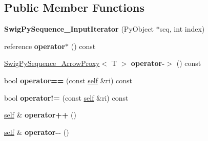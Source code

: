 \subsection*{Public Member Functions}
\begin{DoxyCompactItemize}
\item 
\hypertarget{structswig_1_1_swig_py_sequence___input_iterator_a4c4588a112b05a77b096d5fc87d04d67}{{\bfseries Swig\-Py\-Sequence\-\_\-\-Input\-Iterator} (Py\-Object $\ast$seq, int index)}\label{structswig_1_1_swig_py_sequence___input_iterator_a4c4588a112b05a77b096d5fc87d04d67}

\item 
\hypertarget{structswig_1_1_swig_py_sequence___input_iterator_a0a4b770f1d5777bd0b2a8ff53c25c111}{reference {\bfseries operator$\ast$} () const }\label{structswig_1_1_swig_py_sequence___input_iterator_a0a4b770f1d5777bd0b2a8ff53c25c111}

\item 
\hypertarget{structswig_1_1_swig_py_sequence___input_iterator_aae306e2fb90407ceccedca02691a2879}{\hyperlink{structswig_1_1_swig_py_sequence___arrow_proxy}{Swig\-Py\-Sequence\-\_\-\-Arrow\-Proxy}$<$ T $>$ {\bfseries operator-\/$>$} () const }\label{structswig_1_1_swig_py_sequence___input_iterator_aae306e2fb90407ceccedca02691a2879}

\item 
\hypertarget{structswig_1_1_swig_py_sequence___input_iterator_ad3f5ba24e234cc2dea7874b5854ce0bc}{bool {\bfseries operator==} (const \hyperlink{structswig_1_1_swig_py_sequence___input_iterator}{self} \&ri) const }\label{structswig_1_1_swig_py_sequence___input_iterator_ad3f5ba24e234cc2dea7874b5854ce0bc}

\item 
\hypertarget{structswig_1_1_swig_py_sequence___input_iterator_ad51fd175eed9f938b3b2a330600b0b50}{bool {\bfseries operator!=} (const \hyperlink{structswig_1_1_swig_py_sequence___input_iterator}{self} \&ri) const }\label{structswig_1_1_swig_py_sequence___input_iterator_ad51fd175eed9f938b3b2a330600b0b50}

\item 
\hypertarget{structswig_1_1_swig_py_sequence___input_iterator_a70faeb674de65e5462b734b86e581cd6}{\hyperlink{structswig_1_1_swig_py_sequence___input_iterator}{self} \& {\bfseries operator++} ()}\label{structswig_1_1_swig_py_sequence___input_iterator_a70faeb674de65e5462b734b86e581cd6}

\item 
\hypertarget{structswig_1_1_swig_py_sequence___input_iterator_a9c735104cae5bce3a6f088de2e16163e}{\hyperlink{structswig_1_1_swig_py_sequence___input_iterator}{self} \& {\bfseries operator-\/-\/} ()}\label{structswig_1_1_swig_py_sequence___input_iterator_a9c735104cae5bce3a6f088de2e16163e}


\end{DoxyCompactItemize}
